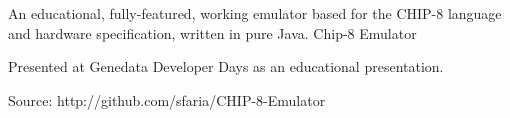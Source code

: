 

\begin{cventries}

  \cventry
    {An educational, fully-featured, working emulator based for the CHIP-8 language and hardware specification, written in pure Java.} %
    {Chip-8 Emulator} %
    {}
    {}
    {
      \begin{cvitems} %
        \item {Presented at Genedata Developer Days as an educational presentation.}
        \item {Source: http://github.com/sfaria/CHIP-8-Emulator}
      \end{cvitems}
    }

\end{cventries}
